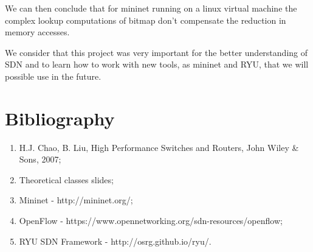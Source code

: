 \documentclass[]{report}
\begin{document}
We can then conclude that for mininet running on a linux virtual machine the complex lookup computations of bitmap don’t compensate the reduction in memory accesses.

We consider that this project was very important for the better understanding of SDN and to learn how to work with new tools, as mininet and RYU, that we will possible use in the future.


\chapter{Bibliography}
\begin{enumerate}
	\item H.J. Chao, B. Liu, High Performance Switches and Routers, John Wiley \& Sons, 2007;
	\item Theoretical classes slides;
	\item Mininet - http://mininet.org/;
	\item OpenFlow - https://www.opennetworking.org/sdn-resources/openflow;
	\item RYU SDN Framework - http://osrg.github.io/ryu/.
\end{enumerate}
\end{document}
